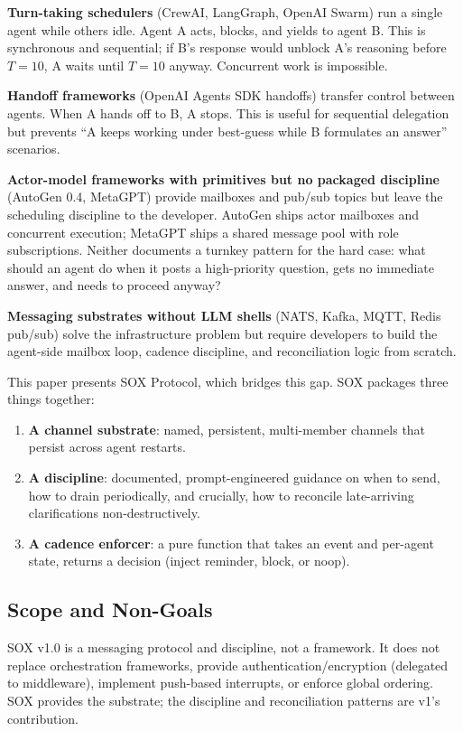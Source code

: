 \documentclass[11pt]{article}
\begin{document}
\textbf{Turn-taking schedulers} (CrewAI, LangGraph, OpenAI Swarm) run a single agent while others idle. Agent A acts, blocks, and yields to agent B. This is synchronous and sequential; if B's response would unblock A's reasoning before $T=10$, A waits until $T=10$ anyway. Concurrent work is impossible.

\textbf{Handoff frameworks} (OpenAI Agents SDK handoffs) transfer control between agents. When A hands off to B, A stops. This is useful for sequential delegation but prevents ``A keeps working under best-guess while B formulates an answer'' scenarios.

\textbf{Actor-model frameworks with primitives but no packaged discipline} (AutoGen 0.4, MetaGPT) provide mailboxes and pub/sub topics but leave the scheduling discipline to the developer. AutoGen ships actor mailboxes and concurrent execution; MetaGPT ships a shared message pool with role subscriptions. Neither documents a turnkey pattern for the hard case: what should an agent do when it posts a high-priority question, gets no immediate answer, and needs to proceed anyway?

\textbf{Messaging substrates without LLM shells} (NATS, Kafka, MQTT, Redis pub/sub) solve the infrastructure problem but require developers to build the agent-side mailbox loop, cadence discipline, and reconciliation logic from scratch.

This paper presents SOX Protocol, which bridges this gap. SOX packages three things together:

\begin{enumerate}
  \item \textbf{A channel substrate}: named, persistent, multi-member channels that persist across agent restarts.
  \item \textbf{A discipline}: documented, prompt-engineered guidance on when to send, how to drain periodically, and crucially, how to reconcile late-arriving clarifications non-destructively.
  \item \textbf{A cadence enforcer}: a pure function that takes an event and per-agent state, returns a decision (inject reminder, block, or noop).
\end{enumerate}

\subsection{Scope and Non-Goals}

SOX v1.0 is a messaging protocol and discipline, not a framework. It does not replace orchestration frameworks, provide authentication/encryption (delegated to middleware), implement push-based interrupts, or enforce global ordering. SOX provides the substrate; the discipline and reconciliation patterns are v1's contribution.
\end{document}
